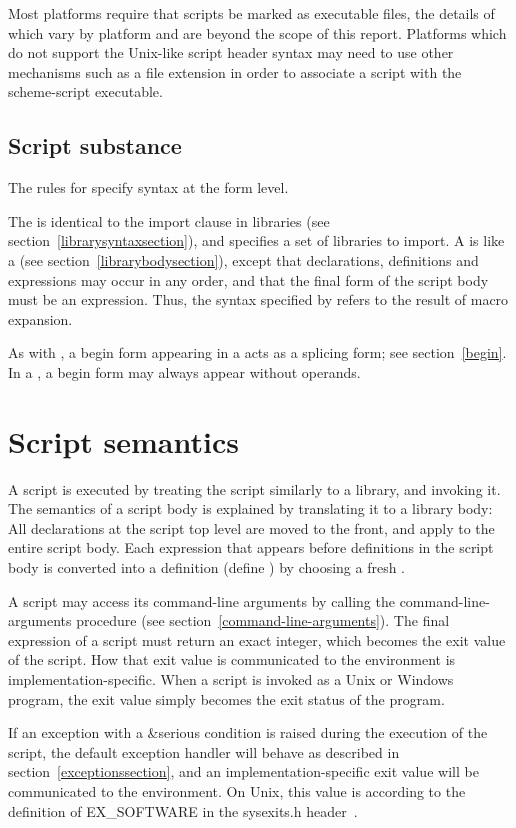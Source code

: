 Most platforms require that scripts be marked as executable files, the 
details of which vary by platform and are beyond the scope of this report. 
Platforms which do not support the Unix-like script header syntax may need 
to use other mechanisms such as a file extension in order to associate a 
script with the {\cf scheme-script} executable.

\subsection{Script substance}

The rules for  specify syntax at the form level.

The  is identical to the import clause in
libraries (see section~\ref{librarysyntaxsection}), 
and specifies a set of libraries to import.  A  is like a  (see
section~\ref{librarybodysection}), except that declarations,
definitions and expressions may occur in any order, and that the final
form of the script body must be an expression.  Thus, the syntax
specified by  refers to the result of macro
expansion.

As with , a {\cf begin} form appearing in a
 acts as a splicing form; see section~\ref{begin}.
In a , a {\cf begin} form may always appear without
operands.

\section{Script semantics}

A script is executed by treating the script similarly to a library, and
invoking it.  The semantics of a script body is explained by
translating it to a library body: All declarations at the script top
level are moved to the front, and apply to the entire script body.
Each expression  that appears before definitions in
the script body is converted into a definition {\cf (define 
  )} by choosing a fresh .

A script may access its command-line arguments by calling the {\cf
  command-line-arguments} procedure (see
section~\ref{command-line-arguments}).  The final expression of a
script must return an exact integer, which becomes the exit value of
the script.  How that exit value is communicated to the environment is
implementation-specific.  When a script is invoked as a Unix or
Windows program, the exit value simply becomes the exit status of the
program.

If an exception with a {\cf\&serious} condition is raised during the
execution of the script, the default exception handler will behave as
described in section~\ref{exceptionssection}, and an
implementation-specific exit value will be communicated to the
environment.  On Unix, this value is according to the definition of
{\cf EX\_SOFTWARE} in the {\cf sysexits.h} header~\cite{srfi22}.

